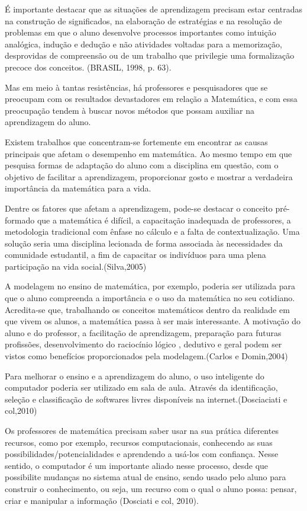 \documentclass[12pt,a4paper]{article}
\begin{document}
É importante destacar que as situações de aprendizagem precisam estar centradas na construção de significados, na elaboração de estratégias e na resolução de problemas em que o aluno desenvolve processos importantes como intuição analógica, indução e dedução e não atividades voltadas para a memorização, desprovidas de compreensão ou de um trabalho que privilegie uma formalização precoce dos conceitos. (BRASIL, 1998, p. 63). 

Mas em meio à tantas resistências, há professores e pesquisadores que se preocupam com os resultados devastadores em relação a Matemática, e com essa preocupação tendem à buscar novos métodos que possam auxiliar na aprendizagem do aluno.

Existem trabalhos que concentram-se fortemente em encontrar as causas principais que afetam o desempenho em matemática. Ao mesmo tempo em que pesquisa formas de adaptação do aluno com a disciplina em questão, com o objetivo de facilitar a aprendizagem, proporcionar gosto e mostrar a verdadeira importância da matemática para a vida. 

Dentre os fatores que afetam a aprendizagem, pode-se destacar o conceito pré-formado que a matemática é difícil, a capacitação inadequada de professores, a metodologia tradicional com ênfase no cálculo e a falta de contextualização. Uma solução seria uma disciplina lecionada de forma associada às necessidades da comunidade estudantil, a fim de capacitar os indivíduos para uma plena participação na vida social.(Silva,2005) 

A modelagem no ensino de matemática, por exemplo, poderia ser utilizada para que o aluno compreenda a importância e o uso da matemática no seu cotidiano. Acredita-se que, trabalhando os conceitos matemáticos dentro da realidade em que vivem os alunos, a matemática passa à ser mais interessante. A motivação do aluno e do professor, a facilitação de aprendizagem, preparação para futuras profissões, desenvolvimento do raciocínio lógico , dedutivo e geral podem ser vistos como benefícios proporcionados pela modelagem.(Carlos e Domin,2004)

Para melhorar o ensino e a aprendizagem do aluno, o uso inteligente do computador poderia ser utilizado em sala de aula. Através da identificação, seleção e classificação de softwares livres disponíveis na internet.(Dosciaciati e col,2010)
	
Os professores de matemática precisam saber usar na sua prática diferentes 	recursos, como por exemplo, recursos computacionais, conhecendo as suas possibilidades/potencialidades e aprendendo a usá-los com confiança. Nesse sentido, o computador é um importante aliado nesse processo, desde que possibilite mudanças 	no  sistema atual de ensino, sendo usado pelo aluno para construir o conhecimento, ou seja, um recurso com o qual o aluno possa: pensar, criar e manipular a informação (Dosciati e col, 2010).
\end{document}
